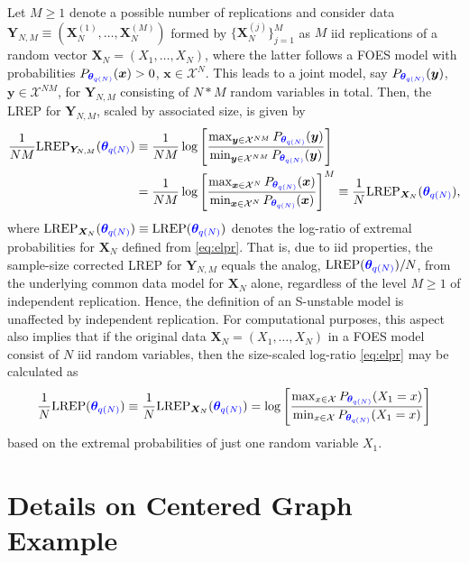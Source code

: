 \documentclass[numbib]{imamat}
\theoremstyle{theorem}
\theoremstyle{lemma}
\theoremstyle{example}
\theoremstyle{corollary}
\theoremstyle{definition}
\theoremstyle{remark}
\theoremstyle{approximation}
\theoremstyle{scheme}
\newcommand{\REP}{\mathrm{LREP}}
\newcommand{\thetaidx}{q(N)}
\newcommand{\thetaN}{\boldsymbol \theta_{\thetaidx}}
\newcommand{\ak}[1]{{\color{blue} #1}}
\let\BeginKnitrBlock\begin \let\EndKnitrBlock\end
\begin{document}
\BeginKnitrBlock{remark}
\iffalse{} {Remark. } \fi{}Let \(M \geq 1\) denote a possible number of replications and consider data \(\boldsymbol Y_{N,M} \equiv (\boldsymbol X^{(1)}_N, \dots, \boldsymbol X^{(M)}_N)\) formed by \(\{ \boldsymbol X^{(j)}_N\}_{j=1}^M\) as \(M\) iid replications of a random vector \(\boldsymbol X_N=(X_1,\ldots,X_N)\), where the latter follows a FOES model with probabilities \(P_{\ak{\thetaN}}(\boldsymbol x)>0\), \(\boldsymbol x\in\mathcal{X}^N\). This leads to a joint model, say \(P_{\ak{\thetaN}}(\boldsymbol y)\), \(\boldsymbol y\in\mathcal{X}^{NM}\), for \(\boldsymbol Y_{N,M}\) consisting of \(N*M\) random variables in total. Then, the LREP for \(\boldsymbol Y_{N,M}\), scaled by associated size, is given by
\begin{align*}
\frac{1}{NM}\REP_{\boldsymbol Y_{N,M}}(\ak{\thetaN} ) &\equiv \frac{1}{NM}\log\left[\frac{\max_{\boldsymbol y \in \mathcal{X}^{NM}}P_{\ak{\thetaN}}(\boldsymbol y)  }{\min_{\boldsymbol y \in \mathcal{X}^{NM}}P_{\ak{\thetaN}}(\boldsymbol y)} \right] \\
&= \frac{1}{NM}\log\left[\frac{\max_{\boldsymbol x \in \mathcal{X}^{N}}P_{\ak{\thetaN}}(\boldsymbol x)  }{\min_{\boldsymbol x \in \mathcal{X}^{N}}P_{\ak{\thetaN}}(\boldsymbol x)} \right]^M \equiv \frac{1}{N}\REP_{\boldsymbol X_{N}}(\ak{\thetaN} ),
\end{align*}
where \(\REP_{\boldsymbol X_{N}}(\ak{\thetaN} ) \equiv \REP(\ak{\thetaN} )\) denotes the log-ratio of extremal probabilities for \(\boldsymbol X_N\) defined from \eqref{eq:elpr}. That is, due to iid properties, the sample-size corrected LREP for \(\boldsymbol Y_{N,M}\) equals the analog, \(\REP(\ak{\thetaN} )/N\), from the underlying common data model for \(\boldsymbol X_N\) alone, regardless of the level \(M \geq 1\) of independent replication. Hence, the definition of an S-unstable model is unaffected by independent replication. For computational purposes, this aspect also implies that if the original data \(\boldsymbol X_N=(X_1,\ldots,X_N)\) in a FOES model consist of \(N\) iid random variables, then the size-scaled log-ratio \eqref{eq:elpr} may be calculated as
\[
\frac{1}{N}\REP( \ak{\thetaN} ) \equiv \frac{1}{N}\REP_{\boldsymbol X_{N}}( \ak{\thetaN} ) = \log\left[ \frac{\max_{ x \in \mathcal{X}}P_{\ak{\thetaN}}(X_1=x)} {\min_{ x \in \mathcal{X}}P_{\ak{\thetaN}}(X_1=x)} \right]
\]
based on the extremal probabilities of just one random variable \(X_1\).
\EndKnitrBlock{remark}

\hypertarget{details-on-centered-graph-example}{%
\section{Details on Centered Graph Example}\label{details-on-centered-graph-example}}
\end{document}
